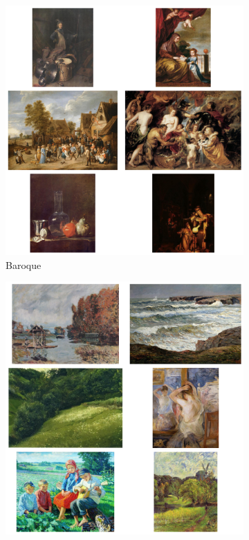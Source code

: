 \documentclass[11pt]{article}
\begin{document}
\begin{figure}[htbp]
    \centering
    \begin{subfigure}[t]{.24\textwidth}
        \includegraphics[width=\linewidth]{../figures/Baroque.png}
        \caption{Baroque}
    \end{subfigure}
    \begin{subfigure}[t]{.24\textwidth}
        \includegraphics[width=\linewidth]{../figures/Impressionism.png}

\end{subfigure}
\end{figure}
\end{document}
